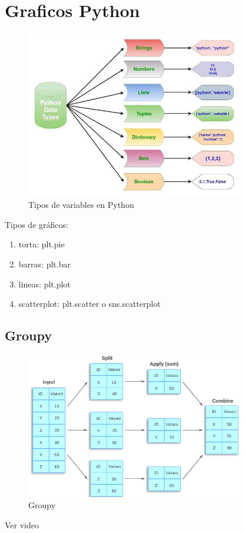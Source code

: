 \documentclass[../main.tex]{subfiles}
\begin{document}
\section{Graficos Python}

    \begin{figure}[ht]
        \centering
        \includegraphics[width=0.85\textwidth]{./images/variables_python.jpg}
        \caption{Tipos de variables en Python}
        \label{fig:tipos_variables_python}
    \end{figure}
   
    Tipos de gráficos:
    \begin{enumerate}
        \item torta: plt.pie
        \item barras: plt.bar
        \item lineas: plt.plot
        \item scatterplot: plt.scatter o sns.scatterplot
    \end{enumerate}

    \subsection{Groupy}
        \begin{figure}[ht]
            \centering
            \includegraphics[width=0.85\textwidth]{./images/groupby.png}
            \caption{Groupy}
            \label{fig:groupy}
        \end{figure}

    Ver video \cite{Pandas_Split_Apply_Combine}
\end{document}
